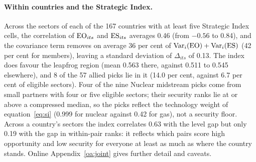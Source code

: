 \paragraph{Within countries and the Strategic Index.} Across the sectors of each of the 167
countries with at least five Strategic Index cells, the correlation of $\mathrm{EO}_{its}$ and $\mathrm{ES}_{its}$
averages 0.46 (from $-0.56$ to 0.84), and the covariance term removes on average 36 per cent of
$\operatorname{Var}_i(\mathrm{EO})+\operatorname{Var}_i(\mathrm{ES})$ (42 per cent for members), leaving a standard
deviation of $\Delta_{its}$ of 0.13. The index does favour the leapfrog region (mean 0.563 there,
against 0.511 to 0.545 elsewhere), and 8 of the 57 allied picks lie in it (14.0 per cent, against
6.7 per cent of eligible sectors). Four of the nine Nuclear midstream picks come from small
partners with four or five eligible sectors; their security ranks lie at or above a compressed
median, so the picks reflect the technology weight of equation~\eqref{eq:si} (0.999 for nuclear
against 0.42 for gas), not a security floor. Across a country's sectors the index correlates 0.63
with the level gap but only 0.19 with the gap in within-pair ranks: it reflects which pairs score
high opportunity and low security for everyone at least as much as where the country stands.
Online Appendix~\ref{oa:joint} gives further detail and caveats.
